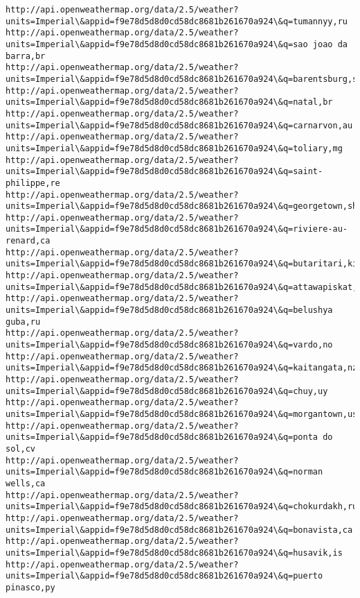 \documentclass[11pt]{article}
\begin{document}
\begin{Verbatim}[commandchars=\\\{\}]
http://api.openweathermap.org/data/2.5/weather?units=Imperial\&appid=f9e78d5d8d0cd58dc8681b261670a924\&q=tumannyy,ru
http://api.openweathermap.org/data/2.5/weather?units=Imperial\&appid=f9e78d5d8d0cd58dc8681b261670a924\&q=sao joao da barra,br
http://api.openweathermap.org/data/2.5/weather?units=Imperial\&appid=f9e78d5d8d0cd58dc8681b261670a924\&q=barentsburg,sj
http://api.openweathermap.org/data/2.5/weather?units=Imperial\&appid=f9e78d5d8d0cd58dc8681b261670a924\&q=natal,br
http://api.openweathermap.org/data/2.5/weather?units=Imperial\&appid=f9e78d5d8d0cd58dc8681b261670a924\&q=carnarvon,au
http://api.openweathermap.org/data/2.5/weather?units=Imperial\&appid=f9e78d5d8d0cd58dc8681b261670a924\&q=toliary,mg
http://api.openweathermap.org/data/2.5/weather?units=Imperial\&appid=f9e78d5d8d0cd58dc8681b261670a924\&q=saint-philippe,re
http://api.openweathermap.org/data/2.5/weather?units=Imperial\&appid=f9e78d5d8d0cd58dc8681b261670a924\&q=georgetown,sh
http://api.openweathermap.org/data/2.5/weather?units=Imperial\&appid=f9e78d5d8d0cd58dc8681b261670a924\&q=riviere-au-renard,ca
http://api.openweathermap.org/data/2.5/weather?units=Imperial\&appid=f9e78d5d8d0cd58dc8681b261670a924\&q=butaritari,ki
http://api.openweathermap.org/data/2.5/weather?units=Imperial\&appid=f9e78d5d8d0cd58dc8681b261670a924\&q=attawapiskat,ca
http://api.openweathermap.org/data/2.5/weather?units=Imperial\&appid=f9e78d5d8d0cd58dc8681b261670a924\&q=belushya guba,ru
http://api.openweathermap.org/data/2.5/weather?units=Imperial\&appid=f9e78d5d8d0cd58dc8681b261670a924\&q=vardo,no
http://api.openweathermap.org/data/2.5/weather?units=Imperial\&appid=f9e78d5d8d0cd58dc8681b261670a924\&q=kaitangata,nz
http://api.openweathermap.org/data/2.5/weather?units=Imperial\&appid=f9e78d5d8d0cd58dc8681b261670a924\&q=chuy,uy
http://api.openweathermap.org/data/2.5/weather?units=Imperial\&appid=f9e78d5d8d0cd58dc8681b261670a924\&q=morgantown,us
http://api.openweathermap.org/data/2.5/weather?units=Imperial\&appid=f9e78d5d8d0cd58dc8681b261670a924\&q=ponta do sol,cv
http://api.openweathermap.org/data/2.5/weather?units=Imperial\&appid=f9e78d5d8d0cd58dc8681b261670a924\&q=norman wells,ca
http://api.openweathermap.org/data/2.5/weather?units=Imperial\&appid=f9e78d5d8d0cd58dc8681b261670a924\&q=chokurdakh,ru
http://api.openweathermap.org/data/2.5/weather?units=Imperial\&appid=f9e78d5d8d0cd58dc8681b261670a924\&q=bonavista,ca
http://api.openweathermap.org/data/2.5/weather?units=Imperial\&appid=f9e78d5d8d0cd58dc8681b261670a924\&q=husavik,is
http://api.openweathermap.org/data/2.5/weather?units=Imperial\&appid=f9e78d5d8d0cd58dc8681b261670a924\&q=puerto pinasco,py

\end{Verbatim}
\end{document}
